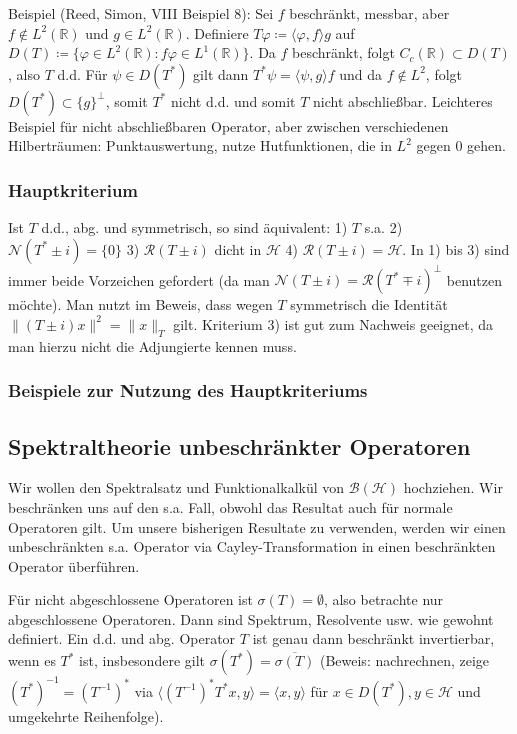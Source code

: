 \documentclass[11pt,a4paper]{scrartcl}
\newcommand{\R}{\mathbb{R}} %
\newcommand{\Hc}{\mathcal{H}}
\newcommand{\B}{\mathcal{B}}
\newcommand{\Nc}{\mathcal{N}}
\newcommand{\Rc}{\mathcal{R}}
\theoremstyle{plain}
\theoremstyle{definition}
\theoremstyle{remark}
\begin{document}
Beispiel (Reed, Simon, VIII Beispiel 8): Sei $f$ beschränkt, messbar, aber $f\not\in L^2(\R)$ und $g\in L^2(\R)$. Definiere $T\varphi \coloneqq \langle \varphi, f \rangle g$ auf $D(T)\coloneqq \{ \varphi\in L^2(\R): f\varphi \in L^1(\R) \}$. Da $f$ beschränkt, folgt $C_c(\R) \subset D(T)$, also $T$ d.d. Für $\psi \in D(T^*)$ gilt dann $T^*\psi = \langle \psi, g \rangle f$ und da $f\not \in L^2$, folgt $D(T^*) \subset \{ g \}^\perp$, somit $T^*$ nicht d.d. und somit $T$ nicht abschließbar. Leichteres Beispiel für nicht abschließbaren Operator, aber zwischen verschiedenen Hilberträumen: Punktauswertung, nutze Hutfunktionen, die in $L^2$ gegen $0$ gehen.

\subsubsection{Hauptkriterium}

Ist $T$ d.d., abg. und symmetrisch, so sind äquivalent: 1) $T$ s.a. 2) $\Nc(T^*\pm i)=\{0\}$ 3) $\Rc(T\pm i)$ dicht in $\Hc$ 4) $\Rc(T\pm i)=\Hc$. In 1) bis 3) sind immer beide Vorzeichen gefordert (da man $\Nc(T\pm i)=\Rc(T^*\mp i)^\perp$ benutzen möchte). Man nutzt im Beweis, dass wegen $T$ symmetrisch die Identität $\|(T\pm i)x\|^2=\|x\|_T$ gilt. Kriterium 3) ist gut zum Nachweis geeignet, da man hierzu nicht die Adjungierte kennen muss.

\subsubsection{Beispiele zur Nutzung des Hauptkriteriums}


\subsection{Spektraltheorie unbeschränkter Operatoren}

Wir wollen den Spektralsatz und Funktionalkalkül von $\B(\Hc)$ hochziehen. Wir beschränken uns auf den s.a. Fall, obwohl das Resultat auch für normale Operatoren gilt. Um unsere bisherigen Resultate zu verwenden, werden wir einen unbeschränkten s.a. Operator via Cayley-Transformation in einen beschränkten Operator überführen.

Für nicht abgeschlossene Operatoren ist $\sigma(T)=\emptyset$, also betrachte nur abgeschlossene Operatoren. Dann sind Spektrum, Resolvente usw. wie gewohnt definiert. Ein d.d. und abg. Operator $T$ ist genau dann beschränkt invertierbar, wenn es $T^*$ ist, insbesondere gilt $\sigma(T^*)=\overline{\sigma(T)}$ (Beweis: nachrechnen, zeige $(T^*)^{-1}=(T^{-1})^*$ via $\langle (T^{-1})^*T^*x,y \rangle = \langle x, y \rangle$ für $x\in D(T^*), y\in \Hc$ und umgekehrte Reihenfolge).
\end{document}
